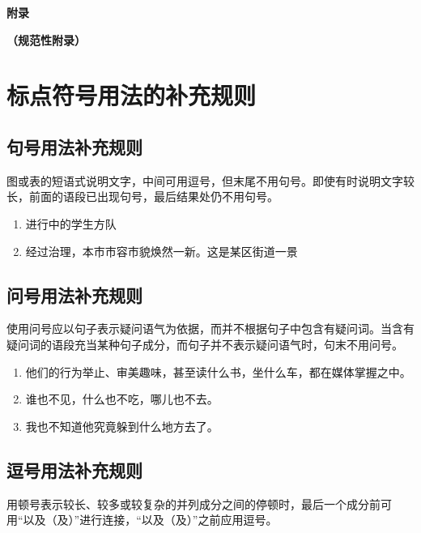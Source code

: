 \documentclass[a4paper]{article}
\begin{document}
\newpage
\appendix

\begin{center}
    \textbf{\Large 附\hspace{1em}录}
    \vspace{0.5em}

    \textbf{\Large （规范性附录）}
\end{center}

\section{\centering 标点符号用法的补充规则}

\subsection{句号用法补充规则}

图或表的短语式说明文字，中间可用逗号，但末尾不用句号。即使有时说明文字较长，前面的语段已出现句号，最后结果处仍不用句号。

\begin{enumerate}
    \item 进行中的学生方队
    \item 经过治理，本市市容市貌焕然一新。这是某区街道一景
\end{enumerate}


\subsection{问号用法补充规则}

使用问号应以句子表示疑问语气为依据，而并不根据句子中包含有疑问词。当含有疑问词的语段充当某种句子成分，而句子并不表示疑问语气时，句末不用问号。

\begin{enumerate}
    \item 他们的行为举止、审美趣味，甚至读什么书，坐什么车，都在媒体掌握之中。
    \item 谁也不见，什么也不吃，哪儿也不去。
    \item 我也不知道他究竟躲到什么地方去了。
\end{enumerate}

\subsection{逗号用法补充规则}

用顿号表示较长、较多或较复杂的并列成分之间的停顿时，最后一个成分前可用“以及（及）”进行连接，“以及（及）”之前应用逗号。
\end{document}
